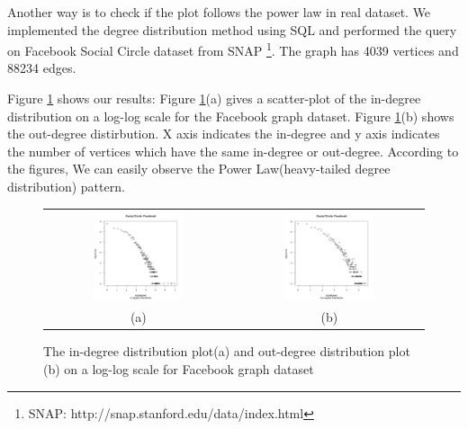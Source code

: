 Another way is to check if the plot follows the power law in real dataset. We implemented the degree distribution method using SQL and performed the query on Facebook Social Circle dataset from SNAP
\footnote{SNAP: http://snap.stanford.edu/data/index.html}. The graph has 4039 vertices and 88234 edges. 

Figure \ref{fig:results} shows our results:
Figure \ref{fig:results}(a) gives a scatter-plot of the in-degree distribution on a log-log scale for the Facebook graph dataset.
Figure \ref{fig:results}(b) shows the out-degree distirbution.
X axis indicates the in-degree and y axis indicates the number of vertices which have the same in-degree or out-degree. 
According to the figures, We can easily observe the Power Law(heavy-tailed degree distribution) pattern.

\begin{figure}[htbf]
\begin{center}
\begin{tabular}{cc}
     \includegraphics[width=0.5\textwidth]{FIG/in_degree.png} &
     \includegraphics[width=0.5\textwidth]{FIG/out_degree.png} \\
    (a) & (b) 
\end{tabular}
\caption{The in-degree distribution plot(a) and out-degree distribution plot (b) on a log-log scale for Facebook graph dataset}
\label{fig:results}
\end{center}
\end{figure}

